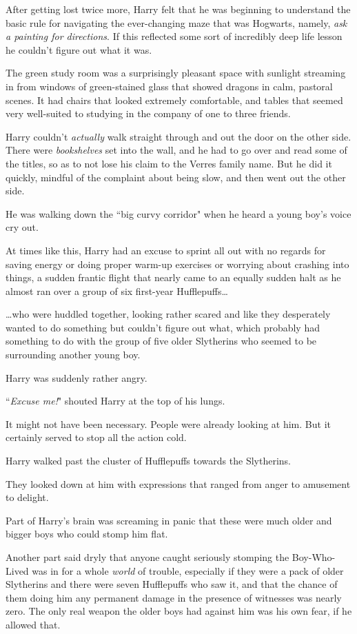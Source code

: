 After getting lost twice more, Harry felt that he was beginning to understand the basic rule for navigating the ever-changing maze that was Hogwarts, namely, \emph{ask a painting for directions}. If this reflected some sort of incredibly deep life lesson he couldn't figure out what it was.

The green study room was a surprisingly pleasant space with sunlight streaming in from windows of green-stained glass that showed dragons in calm, pastoral scenes. It had chairs that looked extremely comfortable, and tables that seemed very well-suited to studying in the company of one to three friends.

Harry couldn't \emph{actually} walk straight through and out the door on the other side. There were \emph{bookshelves} set into the wall, and he had to go over and read some of the titles, so as to not lose his claim to the Verres family name. But he did it quickly, mindful of the complaint about being slow, and then went out the other side.

He was walking down the ``big curvy corridor" when he heard a young boy's voice cry out.

At times like this, Harry had an excuse to sprint all out with no regards for saving energy or doing proper warm-up exercises or worrying about crashing into things, a sudden frantic flight that nearly came to an equally sudden halt as he almost ran over a group of six first-year Hufflepuffs…

…who were huddled together, looking rather scared and like they desperately wanted to do something but couldn't figure out what, which probably had something to do with the group of five older Slytherins who seemed to be surrounding another young boy.

Harry was suddenly rather angry.

``\emph{Excuse me!}" shouted Harry at the top of his lungs.

It might not have been necessary. People were already looking at him. But it certainly served to stop all the action cold.

Harry walked past the cluster of Hufflepuffs towards the Slytherins.

They looked down at him with expressions that ranged from anger to amusement to delight.

Part of Harry's brain was screaming in panic that these were much older and bigger boys who could stomp him flat.

Another part said dryly that anyone caught seriously stomping the Boy-Who-Lived was in for a whole \emph{world} of trouble, especially if they were a pack of older Slytherins and there were seven Hufflepuffs who saw it, and that the chance of them doing him any permanent damage in the presence of witnesses was nearly zero. The only real weapon the older boys had against him was his own fear, if he allowed that.

